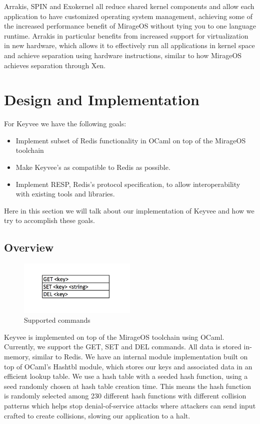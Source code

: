 \documentclass[english,10pt,twocolumn]{article}
\begin{document}
Arrakis\cite{arrakis}, SPIN\cite{spin} and Exokernel\cite{exokernel} all reduce shared kernel components and allow each application to have customized operating system management, achieving some of the increased performance benefit of MirageOS without tying you to one language runtime.
Arrakis in particular benefits from increased support for virtualization in new hardware, which allows it to effectively run all applications in kernel space and achieve separation using hardware instructions, similar to how MirageOS achieves separation through Xen.




\section{Design and Implementation}
For Keyvee we have the following goals:
\begin{itemize}
  \item Implement subset of Redis functionality in OCaml on top of the MirageOS toolchain
  \item Make Keyvee's as compatible to Redis as possible.
  \item Implement RESP, Redis's protocol specification, to allow interoperability with existing tools and libraries.
\end{itemize}

Here in this section we will talk about our implementation of Keyvee and how we try to accomplish these goals.

\subsection{Overview}

\begin{figure}[ht]
  \centering
  \caption{Supported commands}
  \includegraphics[width=0.5\textwidth]{images/commands}
\end{figure}

Keyvee is implemented on top of the MirageOS toolchain using OCaml.
Currently, we support the GET, SET and DEL commands.
All data is stored in-memory, similar to Redis.
We have an internal module implementation built on top of OCaml's Hashtbl module, which stores our keys and associated data in an efficient lookup table.
We use a hash table with a seeded hash function, using a seed randomly chosen at hash table creation time.
This means the hash function is randomly selected among 230 different hash functions with different collision patterns which helps stop denial-of-service attacks where attackers can send input crafted to create collisions, slowing our application to a halt.
\end{document}
